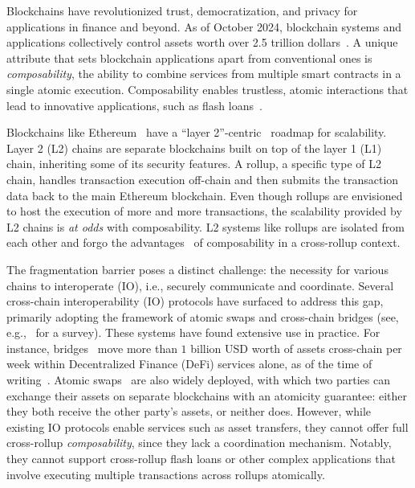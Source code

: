 Blockchains have revolutionized trust, democratization, and privacy for applications in finance and beyond. As of October 2024, blockchain systems and applications collectively control assets worth over 2.5 trillion dollars~\cite{forbes-crypto-cap-24}. A unique attribute that sets blockchain applications apart from conventional ones is {\em composability}, the ability to combine services from multiple smart contracts in a single atomic execution. Composability enables trustless, atomic interactions that lead to innovative applications, such as flash loans~\cite{qin-attacking-defi-flash-loans-21}. 

Blockchains like Ethereum~\cite{wood-ethereum-2014} have a ``layer 2''-centric~\cite{eth-org-layer-2} roadmap for scalability. Layer 2 (L2) chains are separate blockchains built on top of the layer 1 (L1) chain, inheriting some of its security features. A rollup, a specific type of L2 chain, handles transaction execution off-chain and then submits the transaction data back to the main Ethereum blockchain. Even though rollups are envisioned to host the execution of more and more transactions, the scalability provided by L2 chains is {\em at odds} with composability. 
L2 systems like rollups are isolated from each other and forgo the advantages~\cite{a16z-composability} of composability in a cross-rollup context.



The fragmentation barrier poses a distinct challenge: the necessity for various chains to interoperate (IO), i.e., securely communicate and coordinate. Several cross-chain interoperability (IO) protocols have surfaced to address this gap, primarily adopting the framework of atomic swaps and cross-chain bridges (see, e.g.,~\cite{augusto-sok-io-24} for a survey). These systems have found extensive use in practice. 
For instance, bridges~\cite{xiew-zkbridge-22, axelar, near-bridge} move more than $1$ billion USD worth of assets cross-chain per week within Decentralized Finance (DeFi) services alone, as of the time of writing~\cite{defillama-bridges}. 
Atomic swaps~\cite{bitcoin-wiki-htlc,herlihy-atomic-cc-swaps-18} are also widely deployed, with which two parties can exchange their assets on separate blockchains with an atomicity guarantee: either they both receive the other party’s assets, or neither does. 
However, while existing IO protocols enable services such as asset transfers, they cannot offer full cross-rollup {\em composability}, since they lack a coordination mechanism. 
Notably, they cannot support cross-rollup flash loans or other complex applications that involve executing multiple transactions across rollups atomically.


